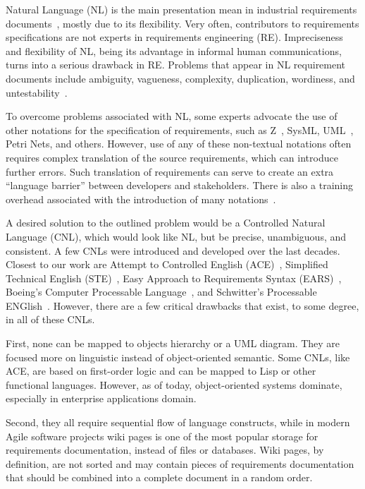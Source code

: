 \documentclass[sigplan,10pt]{acmart}
\newcommand{\nospell}[1]{#1}
\begin{document}
Natural Language (NL) is the main presentation mean in industrial
requirements documents~\citep{kof10,sinha10}, mostly due to its flexibility.
Very often, contributors to requirements specifications are not experts in
requirements engineering (RE). Impreciseness and flexibility of NL, being
its advantage in informal human communications, turns into a serious drawback
in RE. Problems that appear in NL requirement documents include
ambiguity, vagueness, complexity, duplication, wordiness, and
\nospell{untestability}~\citep{ears09}.

To overcome problems associated with NL, some experts advocate the use of
other notations for the specification of requirements, such as
Z~\citep{woodcock96}, SysML, UML~\citep{uml}, Petri Nets, and others. However,
use of any of these non-textual notations often requires complex translation
of the source requirements, which can introduce further errors. Such
translation of requirements can serve to create an extra ``language
barrier'' between developers and stakeholders. There is also a training
overhead associated with the introduction of many notations~\citep{ears09}.

A desired solution to the outlined problem would be a Controlled Natural
Language (CNL), which would look like NL, but be precise,
unambiguous, and consistent. A few CNLs were introduced and developed over
the last decades. Closest to our work are Attempt to Controlled English
(ACE)~\citep{ace06}, Simplified Technical English (STE)~\citep{ste05}, Easy
Approach to Requirements Syntax (EARS)~\citep{ears09}, Boeing's Computer
Processable Language~\citep{clark05}, and \nospell{Schwitter's Processable
ENGlish}~\citep{peng}. However, there are a few critical drawbacks that exist,
to some degree, in all of these CNLs.

First, none can be mapped to objects hierarchy or a UML diagram.
They are focused more on linguistic instead of object-oriented semantic.
Some CNLs, like ACE, are based on first-order logic and can be mapped to
Lisp or other functional languages. However, as of today, object-oriented
systems dominate, especially in enterprise applications domain.

Second, they all require sequential flow of language constructs, while in
modern Agile software projects wiki pages is one of the most popular storage for
requirements documentation, instead of files or databases. Wiki pages, by
definition, are not sorted and may contain pieces of requirements
documentation that should be combined into a complete document in a random
order.
\end{document}
